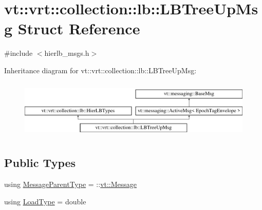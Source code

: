\hypertarget{structvt_1_1vrt_1_1collection_1_1lb_1_1_l_b_tree_up_msg}{}\section{vt\+:\+:vrt\+:\+:collection\+:\+:lb\+:\+:L\+B\+Tree\+Up\+Msg Struct Reference}
\label{structvt_1_1vrt_1_1collection_1_1lb_1_1_l_b_tree_up_msg}


{\ttfamily \#include $<$hierlb\+\_\+msgs.\+h$>$}

Inheritance diagram for vt\+:\+:vrt\+:\+:collection\+:\+:lb\+:\+:L\+B\+Tree\+Up\+Msg\+:\begin{figure}[H]
\begin{center}
\leavevmode
\includegraphics[height=2.847458cm]{structvt_1_1vrt_1_1collection_1_1lb_1_1_l_b_tree_up_msg}
\end{center}
\end{figure}
\subsection*{Public Types}
\begin{DoxyCompactItemize}
\item 
using \hyperlink{structvt_1_1vrt_1_1collection_1_1lb_1_1_l_b_tree_up_msg_a476415f74c2143a0761fe8cca883f5b6}{Message\+Parent\+Type} = \+::\hyperlink{namespacevt_a3a3ddfef40b4c90915fa43cdd5f129ea}{vt\+::\+Message}
\item 
using \hyperlink{structvt_1_1vrt_1_1collection_1_1lb_1_1_l_b_tree_up_msg_a94e88fdd5142e26330a7feb8769de1bb}{Load\+Type} = double
\end{DoxyCompactItemize}
